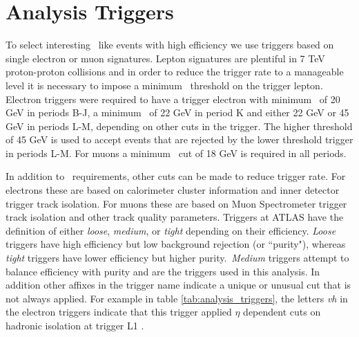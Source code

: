 \section{Analysis Triggers}
\label{sec:analysis_trigger}

To select interesting \ttbar\ like events with high efficiency we use triggers based on single electron or muon signatures. Lepton signatures are plentiful in 7 TeV proton-proton collisions and in order to reduce the trigger rate to a manageable level it is necessary to impose a minimum \pt\ threshold on the trigger lepton. Electron triggers were required to have a trigger electron with minimum \pt\ of 20 GeV in periods B-J, a minimum \pt\ of 22 GeV in period K and either 22 GeV or 45 GeV in periods L-M, depending on other cuts in the trigger. The higher threshold of 45 GeV is used to accept events that are rejected by the lower threshold trigger in periods L-M. For muons a minimum \pt\ cut of 18 GeV is required in all periods.

In addition to \pt\ requirements, other cuts can be made to reduce trigger rate. For electrons these are based on calorimeter cluster information and inner detector trigger track isolation. For muons these are based on Muon Spectrometer trigger track isolation and other track quality parameters. Triggers at ATLAS have the definition of either \emph{loose}, \emph{medium}, or \emph{tight} depending on their efficiency. \emph{Loose} triggers have high efficiency but low background rejection (or ``purity"), whereas \emph{tight} triggers have lower efficiency but higher purity.~\emph{Medium} triggers attempt to balance efficiency with purity and are the triggers used in this analysis. In addition other affixes in the trigger name indicate a unique or unusual cut that is not always applied. For example in table \ref{tab:analysis_triggers}, the letters \emph{vh} in the electron triggers indicate that this trigger applied $\eta$ dependent cuts on hadronic isolation at trigger L1 \cite{LeptonTrigger}.

